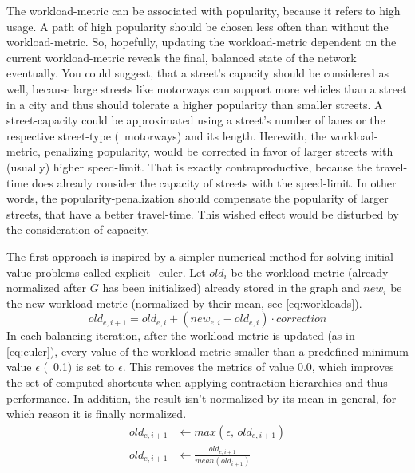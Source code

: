         The workload-\gls{metric} can be associated with popularity, because it refers to high usage.
        A path of high popularity should be chosen less often than without the workload-\gls{metric}.
        So, hopefully, updating the workload-\gls{metric} dependent on the current workload-\gls{metric} reveals the final, balanced state of the network eventually.
        You could suggest, that a street's capacity should be considered as well, because large streets like motorways can support more vehicles than a street in a city and thus should tolerate a higher popularity than smaller streets.
        A street-capacity could be approximated using a street's number of lanes or the respective street-type (\eg\ motorways) and its length.
        Herewith, the workload-\gls{metric}, penalizing popularity, would be corrected in favor of larger streets with (usually) higher speed-limit.
        That is exactly contraproductive, because the travel-time does already consider the capacity of streets with the speed-limit.
        In other words, the popularity-penalization should compensate the popularity of larger streets, that have a better travel-time.
        This wished effect would be disturbed by the consideration of capacity.

        The first approach is inspired by a simpler numerical method for solving initial-value-problems called \gls{explicit_euler}.
        Let $\mathit{old}_i$ be the workload-\gls{metric} (already normalized after $G$ has been initialized) already stored in the graph and $\mathit{new}_i$ be the new workload-\gls{metric} (normalized by their mean, see \vref{eq:workloads}).
        \begin{equation}
        \label{eq:euler}
            \mathit{old}_{e,i+1} = \mathit{old}_{e,i} + (\mathit{new}_{e,i} - \mathit{old}_{e,i}) \cdot \mathit{correction}
        \end{equation}
        In each \gls{balancing}-iteration, after the workload-\gls{metric} is updated (as in \vref{eq:euler}), every value of the workload-\gls{metric} smaller than a predefined minimum value $\epsilon$ (\eg\ \num{0.1}) is set to $\epsilon$.
        This removes the \glspl{metric} of value \num{0.0}, which improves the set of computed shortcuts when applying \gls{contraction-hierarchies} and thus performance.
        In addition, the result isn't normalized by its mean in general, for which reason it is finally normalized.
        \begin{equation}
        \label{eq:metric_cleanup}
        \begin{aligned}
            \mathit{old}_{e,i+1} &\leftarrow \mathit{max} \left( \epsilon \text{,\ } \mathit{old}_{e,i+1} \right)\\
            \mathit{old}_{e,i+1} &\leftarrow \frac{\mathit{old}_{e,i+1}}{\mathit{mean}(\mathit{old}_{i+1})}
        \end{aligned}
        \end{equation}

